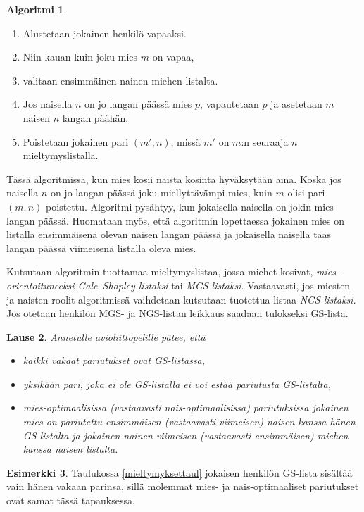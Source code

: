 \documentclass[finnish]{tktltiki2}
\newtheorem{lau}{Lause}
\theoremstyle{definition}
\newtheorem{alg}[lau]{Algoritmi}
\newtheorem{esim}[lau]{Esimerkki}
\theoremstyle{remark}
\begin{document}
\begin{alg}\cite[s. 16]{gusfield1989stable}\label{alg2}
	\begin{enumerate}
		\item Alustetaan jokainen henkilö vapaaksi.
		\item Niin kauan kuin joku mies $m$ on vapaa,
		\item valitaan ensimmäinen nainen miehen listalta.
		\item Jos naisella $n$ on jo langan päässä mies $p$, vapautetaan $p$ ja asetetaan $m$ naisen $n$ langan päähän.
		\item Poistetaan jokainen pari $(m', n)$, missä $m'$ on $m$:n seuraaja $n$ mieltymyslistalla.
	\end{enumerate}
\end{alg}

Tässä algoritmissä, kun mies kosii naista kosinta hyväksytään aina. Koska jos naisella $n$ on jo langan päässä joku miellyttävämpi mies, kuin $m$ olisi pari $(m, n)$ poistettu.
Algoritmi pysähtyy, kun jokaisella naisella on jokin mies langan päässä. Huomataan myös, että algoritmin lopettaessa jokainen mies on listalla ensimmäisenä olevan naisen langan päässä ja jokaisella naisella taas langan päässä viimeisenä listalla oleva mies.

Kutsutaan algoritmin tuottamaa mieltymyslistaa, jossa miehet kosivat, \emph{mies-orientoituneeksi Gale--Shapley listaksi} tai \emph{MGS-listaksi}. Vastaavasti, jos miesten ja naisten roolit algoritmissä vaihdetaan kutsutaan tuotettua listaa \emph{NGS-listaksi}. Jos otetaan henkilön MGS- ja NGS-listan leikkaus saadaan tulokseksi GS-lista.

\begin{lau}\cite[s. 17]{gusfield1989stable}\label{laajlause}
	Annetulle avioliittopelille pätee, että
	\begin{itemize}
		\item kaikki vakaat pariutukset ovat GS-listassa,
		\item yksikään pari, joka ei ole GS-listalla ei voi estää pariutusta GS-listalta,
		\item mies-optimaalisissa (vastaavasti nais-optimaalisissa) pariutuksissa jokainen mies on pariutettu ensimmäisen (vastaavasti viimeisen) naisen kanssa hänen GS-listalta ja jokainen nainen viimeisen (vastaavasti ensimmäisen) miehen kanssa naisen listalta.
	\end{itemize}
\end{lau}

\begin{esim}
	Taulukossa \ref{mieltymyksettaul} jokaisen henkilön GS-lista sisältää vain hänen vakaan parinsa, sillä molemmat mies- ja nais-optimaaliset pariutukset ovat samat tässä tapauksessa.
\end{esim}
\end{document}
